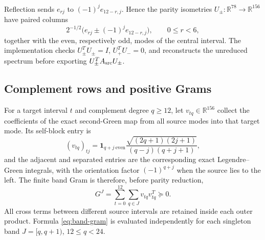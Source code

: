 \documentclass[10pt]{article}
\begin{document}
Reflection sends $e_{rj}$ to $(-1)^j e_{12-r,j}$.  Hence the parity isometries
$U_\pm:\mathbb R^{78}\to\mathbb R^{156}$ have paired columns
\begin{equation}\label{eq:parity-map}
 2^{-1/2}\bigl(e_{rj}\pm(-1)^j e_{12-r,j}\bigr),\qquad 0\le r<6,
\end{equation}
together with the even, respectively odd, modes of the central interval.
The implementation checks $U_\pm^TU_\pm=I$, $U_+^TU_-=0$, and reconstructs
the unreduced spectrum before exporting $U_\pm^TA_{\rm src}U_\pm$.

\subsection{Complement rows and positive Grams}

For a target interval $t$ and complement degree $q\ge12$, let
$v_{tq}\in\mathbb R^{156}$ collect the coefficients of the exact second-Green
map from all source modes into that target mode.  Its self-block entry is
\begin{equation}\label{eq:self-row}
 (v_{tq})_{tj}=\mathbf1_{q+j\ \mathrm{even}}
 \frac{\sqrt{(2q+1)(2j+1)}}{(q-j)(q+j+1)},
\end{equation}
and the adjacent and separated entries are the corresponding exact
Legendre--Green integrals, with the orientation factor $(-1)^{q+j}$ when the
source lies to the left.  The finite band Gram is therefore, before parity
reduction,
\begin{equation}\label{eq:band-gram}
 G^{J}=\sum_{t=0}^{12}\sum_{q\in J}v_{tq}v_{tq}^{T}\succeq0.
\end{equation}
All cross terms between different source intervals are retained inside each
outer product.  Formula \eqref{eq:band-gram} is evaluated independently for
each singleton band $J=[q,q+1)$, $12\le q<24$.
\end{document}
